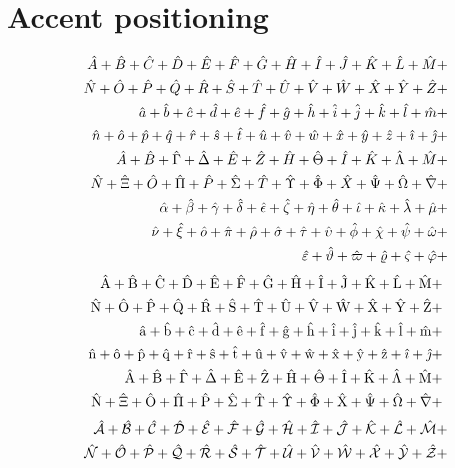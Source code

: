 \documentclass[fleqn]{article}
\def\test#1{#1}
\def\testupperi{%
  \test A \test B \test C \test D \test E \test F \test G \test H
  \test I \test J \test K \test L \test M }
\def\testupperii{%
  \test N \test O \test P \test Q \test R \test S \test T \test U
  \test V \test W \test X \test Y \test Z }
\def\testloweri{%
  \test a \test b \test c \test d \test e \test f \test g \test h
  \test i \test j \test k \test l \test m }
\def\testlowerii{%
  \test n \test o \test p \test q \test r \test s \test t \test u
  \test v \test w \test x \test y \test z 
  \test\imath \test\jmath }
\def\testupgreeki{%
  \test A \test B \test\Gamma \test\Delta \test E \test Z \test H
  \test\Theta \test I \test K \test\Lambda \test M }
\def\testupgreekii{%
  \test N \test\Xi \test O \test\Pi \test P \test\Sigma \test T
  \test\Upsilon \test\Phi \test X \test\Psi \test\Omega 
  \test\nabla }
\def\testlowgreeki{%
  \test\alpha \test\beta \test\gamma \test\delta \test\epsilon
  \test\zeta \test\eta \test\theta \test\iota \test\kappa \test\lambda
  \test\mu }
\def\testlowgreekii{%
  \test\nu \test\xi \test o \test\pi \test\rho \test\sigma \test\tau
  \test\upsilon \test\phi \test\chi \test\psi \test\omega }
\def\testlowgreekiii{%
  \test\varepsilon \test\vartheta \test\varpi \test\varrho
  \test\varsigma \test\varphi}
\begin{document}
\clearpage
\section{Accent positioning}

\def\test#1{\hat{#1}+}%
\begin{eqnarray*}
  && {\testupperi}\\
  && {\testupperii}\\
  && {\testloweri}\\ 
  && {\testlowerii}\\ 
  && {\testupgreeki}\\
  && {\testupgreekii}\\
  && {\testlowgreeki}\\
  && {\testlowgreekii}\\
  && {\testlowgreekiii}
\end{eqnarray*}%
%
\def\test#1{\hat{\mathrm{#1}}+}%
\begin{eqnarray*}
  && {\testupperi}\\
  && {\testupperii}\\
  && {\testloweri}\\ 
  && {\testlowerii}\\ 
  && {\testupgreeki}\\
  && {\testupgreekii}
\end{eqnarray*}%
%
%
\def\test#1{\hat{\mathcal{#1}}+}%
\begin{eqnarray*}
  && {\testupperi}\\
  && {\testupperii}
\end{eqnarray*}%
\end{document}
